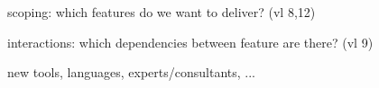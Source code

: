 \begin{frame}{\myframetitle}
	scoping: which features do we want to deliver? (vl 8,12)

	interactions: which dependencies between feature are there? (vl 9)

	new tools, languages, experts/consultants, ...
\end{frame}



